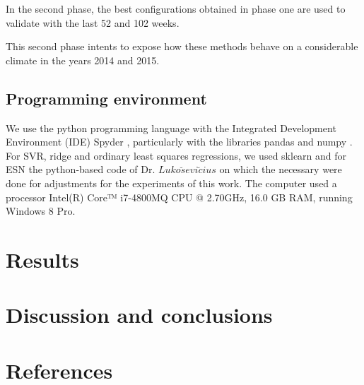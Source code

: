 \documentclass[review]{elsarticle}
\begin{document}
In the second phase, the best configurations obtained in phase one are used to validate with the last 52 and 102 weeks. 

This second phase intents to expose how these methods behave on a considerable climate in the years 2014 and 2015.

\subsection{Programming environment}

We use the python programming language with the Integrated Development Environment (IDE) Spyder \citep{Continuum2015}, particularly with the libraries pandas \citep{mckinneypandas2010} and numpy \citep{vanderWalt2011}. For SVR, ridge and ordinary least squares regressions, we used sklearn \citep{scikitlearn2011} and for ESN the python-based code of Dr. $Luko\breve{s} evi \breve{c} ius$ \citep{Lukose2012} on which the necessary were done for adjustments for the experiments of this work. The computer used a processor Intel(R) Core™ i7-4800MQ CPU @ 2.70GHz, 16.0 GB RAM, running Windows 8 Pro.

\section{Results}

\section{Discussion and conclusions}

\section{References}
\end{document}
